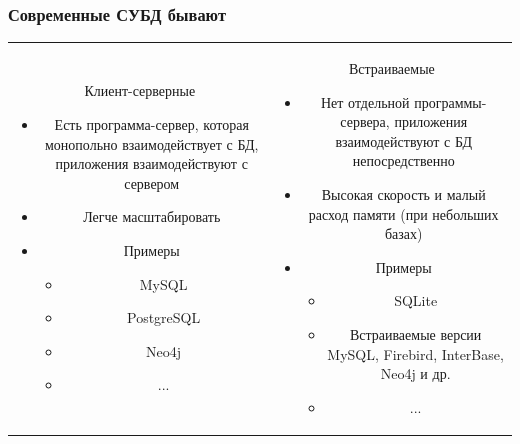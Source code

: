 \documentclass[aspectratio=169]{beamer}
\begin{document}
\begin{frame}[fragile]
  \transwipe[direction=90]
  \frametitle{Современные СУБД бывают}

  \begin{tabular}{cc}
    \begin{minipage}{.45\textwidth}
      Клиент-серверные
      \begin{itemize}
        \item Есть программа-сервер, которая монопольно взаимодействует с БД, приложения взаимодействуют с сервером
        \item Легче масштабировать
        \item Примеры
        \begin{itemize}
            \item MySQL
            \item PostgreSQL
            \item Neo4j
            \item ...
        \end{itemize}
      \end{itemize}
    \end{minipage}
    & 
    \begin{minipage}{.5\textwidth}
      Встраиваемые
      \begin{itemize}
        \item Нет отдельной программы-сервера, приложения взаимодействуют с БД непосредственно
        \item Высокая скорость и малый расход памяти (при небольших базах)
        \item Примеры
        \begin{itemize}
            \item SQLite
            \item Встраиваемые версии MySQL, Firebird, InterBase, Neo4j и др.
            \item ...
        \end{itemize}
      \end{itemize}
    \end{minipage}
  \end{tabular}
\end{frame}
\end{document}
